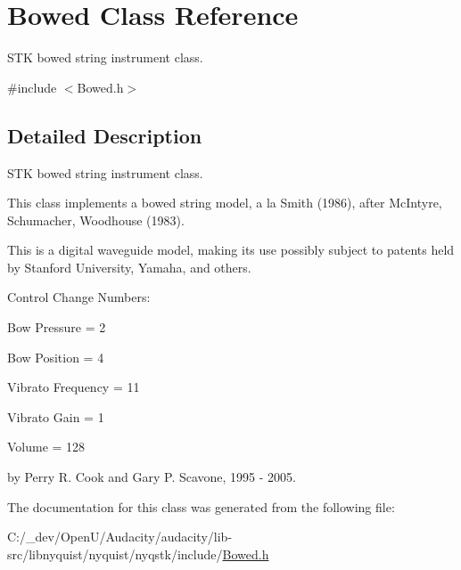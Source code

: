 \hypertarget{class_bowed}{}\section{Bowed Class Reference}
\label{class_bowed}


S\+TK bowed string instrument class.  




{\ttfamily \#include $<$Bowed.\+h$>$}



\subsection{Detailed Description}
S\+TK bowed string instrument class. 

This class implements a bowed string model, a la Smith (1986), after Mc\+Intyre, Schumacher, Woodhouse (1983).

This is a digital waveguide model, making its use possibly subject to patents held by Stanford University, Yamaha, and others.

Control Change Numbers\+:
\begin{DoxyItemize}
\item Bow Pressure = 2
\item Bow Position = 4
\item Vibrato Frequency = 11
\item Vibrato Gain = 1
\item Volume = 128
\end{DoxyItemize}

by Perry R. Cook and Gary P. Scavone, 1995 -\/ 2005. 

The documentation for this class was generated from the following file\+:\begin{DoxyCompactItemize}
\item 
C\+:/\+\_\+dev/\+Open\+U/\+Audacity/audacity/lib-\/src/libnyquist/nyquist/nyqstk/include/\hyperlink{_bowed_8h}{Bowed.\+h}\end{DoxyCompactItemize}
